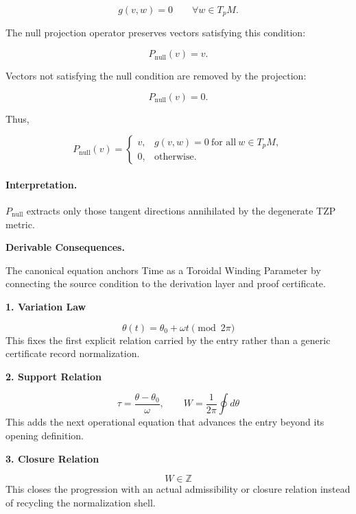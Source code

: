 \begin{equation}
g(v,w)=0
\qquad
\forall w\in T_pM .
\end{equation}

The null projection operator preserves vectors satisfying this condition:

\begin{equation}
P_{\mathrm{null}}(v)=v .
\end{equation}

Vectors not satisfying the null condition are removed by the projection:

\begin{equation}
P_{\mathrm{null}}(v)=0 .
\end{equation}

Thus,

\begin{equation}
\boxed{
P_{\mathrm{null}}(v)
=
\begin{cases}
v, & g(v,w)=0\ \text{for all}\ w\in T_pM,\\
0, & \text{otherwise}.
\end{cases}
}
\end{equation}

\paragraph{Interpretation.}
$P_{\mathrm{null}}$ extracts only those tangent directions annihilated by the degenerate TZP metric.

\par\vspace{0.35em}
\noindent\textbf{Derivable Consequences.}\quad
\begingroup
\footnotesize
\raggedright
The canonical equation anchors Time as a Toroidal Winding Parameter by connecting the source condition to the derivation layer and proof certificate.
\par\endgroup

\noindent\textbf{1. Variation Law}\par
\[
\theta(t)=\theta_{0}+\omega t \pmod{2\pi}
\]
\noindent This fixes the first explicit relation carried by the entry rather than a generic certificate record normalization.\par
\noindent\textbf{2. Support Relation}\par
\[
\tau=\frac{\theta-\theta_{0}}{\omega},\qquad W=\frac{1}{2\pi}\oint d\theta
\]
\noindent This adds the next operational equation that advances the entry beyond its opening definition.\par
\noindent\textbf{3. Closure Relation}\par
\[
W\in\mathbb{Z}
\]
\noindent This closes the progression with an actual admissibility or closure relation instead of recycling the normalization shell.\par


